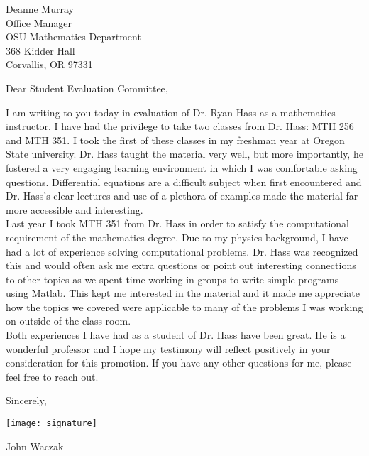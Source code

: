 \documentclass[11pt,twoside]{letter}
\date{\today}
\begin{document}
\begin{letter}{
    Deanne Murray \\
    Office Manager \\
    OSU Mathematics Department \\
    368 Kidder Hall \\
    Corvallis, OR 97331 \\ 
  }

  \opening{Dear Student Evaluation Committee,}
  
  I am writing to you today in evaluation of Dr. Ryan Hass as a mathematics instructor. I have had the privilege to take two classes from Dr. Hass: MTH 256 and MTH 351. I took the first of these classes in my freshman year at Oregon State university. Dr. Hass taught the material very well, but more importantly, he fostered a very engaging learning environment in which I was comfortable asking questions. Differential equations are a difficult subject when first encountered and Dr. Hass's clear lectures and use of a plethora of examples made the material far more accessible and interesting. \\ 
  
  Last year I took MTH 351 from Dr. Hass in order to satisfy the computational requirement of the mathematics degree. Due to my physics background, I have had a lot of experience solving computational problems. Dr. Hass was recognized this and would often ask me extra questions or point out interesting connections to other topics as we spent time working in groups to write simple programs using Matlab. This kept me interested in the material and it made me appreciate how the topics we covered were applicable to many of the problems I was working on outside of the class room.  \\ 
  
  Both experiences I have had as a student of Dr. Hass have been great. He is a wonderful professor and I hope my testimony will reflect positively in your consideration for this promotion. If you have any other questions for me, please feel free to reach out. 

    \begin{center}
        Sincerely, 
        
        \texttt{[image: signature]}
        
        John Waczak
    \end{center}
\end{letter}
\end{document}

